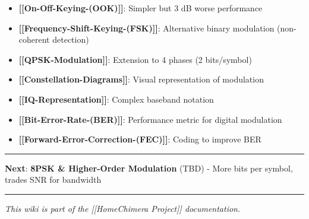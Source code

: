 \begin{itemize}
\tightlist
\item
  \textbf{{[}{[}On-Off-Keying-(OOK){]}{]}}: Simpler but 3 dB worse
  performance
\item
  \textbf{{[}{[}Frequency-Shift-Keying-(FSK){]}{]}}: Alternative binary
  modulation (non-coherent detection)
\item
  \textbf{{[}{[}QPSK-Modulation{]}{]}}: Extension to 4 phases (2
  bits/symbol)
\item
  \textbf{{[}{[}Constellation-Diagrams{]}{]}}: Visual representation of
  modulation
\item
  \textbf{{[}{[}IQ-Representation{]}{]}}: Complex baseband notation
\item
  \textbf{{[}{[}Bit-Error-Rate-(BER){]}{]}}: Performance metric for
  digital modulation
\item
  \textbf{{[}{[}Forward-Error-Correction-(FEC){]}{]}}: Coding to improve
  BER
\end{itemize}

\begin{center}\rule{0.5\linewidth}{0.5pt}\end{center}

\textbf{Next}: \textbf{8PSK \& Higher-Order Modulation} (TBD) - More
bits per symbol, trades SNR for bandwidth

\begin{center}\rule{0.5\linewidth}{0.5pt}\end{center}

\emph{This wiki is part of the {[}{[}Home\textbar Chimera Project{]}{]}
documentation.}
